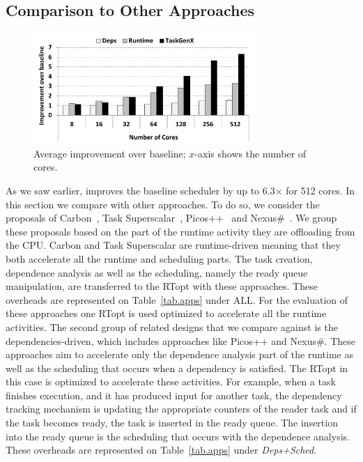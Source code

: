 \subsection{Comparison to Other Approaches}
\begin{figure}[t]
	\centering
	\includegraphics[width=0.75\textwidth]{figures/comparison.pdf}
	\caption{Average improvement over baseline; $x$-axis shows the number of cores.}
	\label{fig:compare}
\end{figure}
As we saw earlier, {\proposal} improves the baseline scheduler by up to 6.3$\times$ for 512 cores.
In this section we compare {\proposal} with other approaches.
To do so, we consider the proposals of Carbon~\cite{Carbon}, Task Superscalar~\cite{TaskSS}, Picos++~\cite{Xubin} and Nexus\#~\cite{Nexus}.
We group these proposals based on the part of the runtime activity they are offloading from the CPU.
Carbon and Task Superscalar are runtime-driven meaning that they both accelerate all the runtime and scheduling parts.
The task creation, dependence analysis as well as the scheduling, namely the ready queue manipulation, are transferred to the RTopt with these approaches. 
These overheads are represented on Table~\ref{tab.apps} under ALL.
For the evaluation of these approaches one RTopt is used optimized to accelerate all the runtime activities. 
The second group of related designs that we compare against is the dependencies-driven, which includes approaches like Picos++ and Nexus\#. 
These approaches aim to accelerate only the dependence analysis part of the runtime as well as the scheduling that occurs when a dependency is satisfied.
The RTopt in this case is optimized to accelerate these activities.
For example, when a task finishes execution, and it has produced input for another task, the dependency tracking mechanism is updating the appropriate counters of the reader task and if the task becomes ready, the task is inserted in the ready queue.
The insertion into the ready queue is the scheduling that occurs with the dependence analysis.
These overheads are represented on Table~\ref{tab.apps} under \textit{Deps+Sched}.

